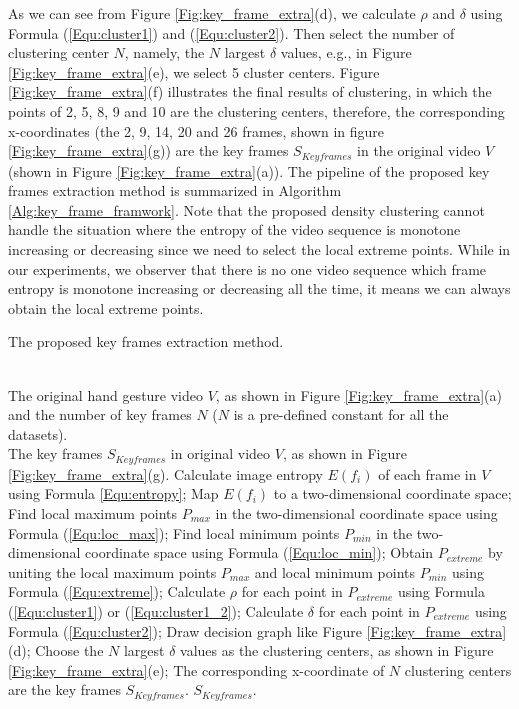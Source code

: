 \documentclass[5p]{elsarticle}
\begin{document}
As we can see from  Figure \ref{Fig:key_frame_extra}(d), we calculate $\rho$ and $\delta$ using Formula (\ref{Equ:cluster1}) and (\ref{Equ:cluster2}).
Then select the number of clustering center $N$, namely, the $N$ largest $\delta$ values, e.g., in Figure \ref{Fig:key_frame_extra}(e), we select 5 cluster centers.
Figure \ref{Fig:key_frame_extra}(f) illustrates the final results of clustering, in which the points of 2, 5, 8, 9 and 10 are the clustering centers, therefore, the corresponding x-coordinates (the 2, 9, 14, 20 and 26 frames, shown in figure \ref{Fig:key_frame_extra}(g)) are the key frames $S_\mathit{Keyframes}$ in the original video $V$ (shown in Figure \ref{Fig:key_frame_extra}(a)).
The pipeline of the proposed key frames extraction method is summarized in Algorithm \ref{Alg:key_frame_framwork}.
Note that the proposed density clustering cannot handle the situation where the entropy of the video sequence is monotone increasing or decreasing since we need to select the local extreme points.
While in our experiments, we observer that there is no one video sequence which frame entropy is monotone increasing or decreasing all the time, it means we can always obtain the local extreme points.

\begin{algorithm}[!t] \small
	\caption{The proposed key frames extraction method.}
	\label{Alg:key_frame_framwork}
	\begin{algorithmic}[1] 
		\REQUIRE ~~\\
		The original hand gesture video $V$, as shown in Figure \ref{Fig:key_frame_extra}(a) and the number of key frames $N$ ($N$ is a pre-defined constant for all the datasets).
		\ENSURE ~~\\ 
		The key frames $S_\mathit{Keyframes}$ in original video $V$, as shown in Figure \ref{Fig:key_frame_extra}(g).
		\STATE Calculate image entropy $E(f_i)$ of each frame in $V$ using Formula \ref{Equ:entropy};
		\STATE Map $E(f_i)$ to a two-dimensional coordinate space;
		\STATE Find local maximum points $P_\mathit{max}$ in the two-dimensional coordinate space using Formula (\ref{Equ:loc_max});
		\STATE Find local minimum points $P_\mathit{min}$ in the two-dimensional coordinate space using Formula (\ref{Equ:loc_min});
		\STATE Obtain $P_\mathit{extreme}$ by uniting the local maximum points $P_\mathit{max}$ and local minimum points $P_\mathit{min}$ using Formula (\ref{Equ:extreme});
		\STATE Calculate $\rho$ for each point in $P_\mathit{extreme}$ using Formula (\ref{Equ:cluster1}) or (\ref{Equ:cluster1_2});
		\STATE Calculate $\delta$ for each point in $P_\mathit{extreme}$ using Formula (\ref{Equ:cluster2});
		\STATE Draw decision graph like Figure \ref{Fig:key_frame_extra}(d);
		\STATE Choose the $N$ largest $\delta$ values as the clustering centers, as shown in Figure \ref{Fig:key_frame_extra}(e);
		\STATE The corresponding x-coordinate of $N$ clustering centers are the key frames $S_\mathit{Keyframes}$.
		\RETURN $S_\mathit{Keyframes}$.
	\end{algorithmic}
\end{algorithm}
\end{document}
